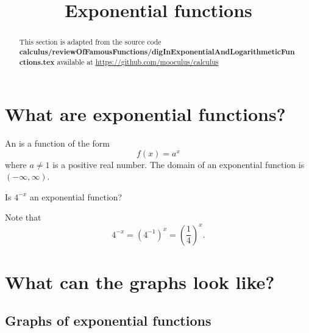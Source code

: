 \documentclass{ximera}
\title[Dig-In:]{Exponential functions}
\begin{document}
\begin{abstract}
This section is adapted from the source code {\bf calculus/reviewOfFamousFunctions/digInExponentialAndLogarithmeticFunctions.tex} available at \url{https://github.com/mooculus/calculus}
\end{abstract}
\maketitle
 


\section{What are exponential functions?}
 

\begin{definition}
  An  is a function of the form
  \[
  f(x) = a^x
  \]
  where  $a\ne 1$ is a positive real number. The domain of an
  exponential function is $(-\infty,\infty)$.
\end{definition}

\begin{question}
  Is $4^{-x}$ an exponential function?
  \begin{prompt}
  \begin{multipleChoice}
  \end{multipleChoice}
  \end{prompt}
  \begin{feedback}
    Note that
    \[
    4^{-x} = \left(4^{-1}\right)^x = \left(\frac{1}{4}\right)^x.
    \]
  \end{feedback}
\end{question}



 
\section{What can the graphs look like?}
 
\subsection{Graphs of exponential functions}
 
\end{document}
